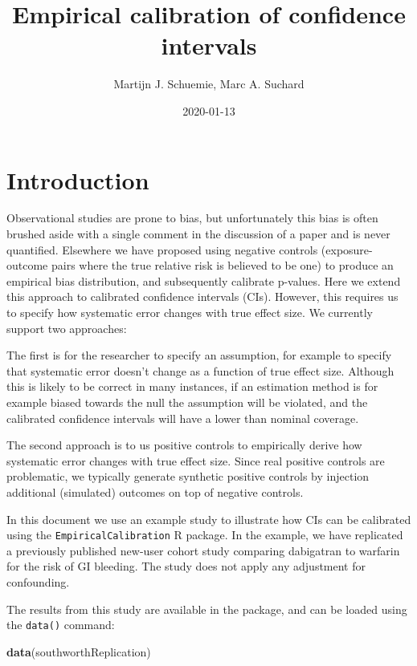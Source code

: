 \documentclass[
]{article}
\title{Empirical calibration of confidence intervals}
\author{Martijn J. Schuemie, Marc A. Suchard}
\date{2020-01-13}
\newenvironment{Shaded}{\begin{snugshade}}{\end{snugshade}}
\newcommand{\KeywordTok}[1]{\textcolor[rgb]{0.13,0.29,0.53}{\textbf{#1}}}
\newcommand{\NormalTok}[1]{#1}
\begin{document}
\maketitle

{
\setcounter{tocdepth}{2}
\tableofcontents
}
\hypertarget{introduction}{%
\section{Introduction}\label{introduction}}

Observational studies are prone to bias, but unfortunately this bias is
often brushed aside with a single comment in the discussion of a paper
and is never quantified. Elsewhere we have proposed using negative
controls (exposure-outcome pairs where the true relative risk is
believed to be one) to produce an empirical bias distribution, and
subsequently calibrate p-values. Here we extend this approach to
calibrated confidence intervals (CIs). However, this requires us to
specify how systematic error changes with true effect size. We currently
support two approaches:

The first is for the researcher to specify an assumption, for example to
specify that systematic error doesn't change as a function of true
effect size. Although this is likely to be correct in many instances, if
an estimation method is for example biased towards the null the
assumption will be violated, and the calibrated confidence intervals
will have a lower than nominal coverage.

The second approach is to us positive controls to empirically derive how
systematic error changes with true effect size. Since real positive
controls are problematic, we typically generate synthetic positive
controls by injection additional (simulated) outcomes on top of negative
controls.

In this document we use an example study to illustrate how CIs can be
calibrated using the \texttt{EmpiricalCalibration} R package. In the
example, we have replicated a previously published new-user cohort study
comparing dabigatran to warfarin for the risk of GI bleeding. The study
does not apply any adjustment for confounding.

The results from this study are available in the package, and can be
loaded using the \texttt{data()} command:

\begin{Shaded}
\begin{Highlighting}[]
\KeywordTok{data}\NormalTok{(southworthReplication)}
\end{Highlighting}
\end{Shaded}
\end{document}
